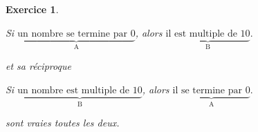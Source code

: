 \documentclass[10pt]{article}
\newtheorem{exo}{Exercice}
\begin{document}
\begin{exo}
\begin{enumerate}
\begin{center}
Si $\underbrace{\text{un nombre se termine par 0}}_{\text{A}}$, alors $\underbrace{\text{il est multiple de 10}}_{\text{B}}.$

\end{center}

et sa réciproque

\begin{center}

Si $\underbrace{\text{un nombre est multiple de 10}}_{\text{B}}$, alors $\underbrace{\text{il se termine par 0}}_{\text{A}}.$

\end{center}

sont vraies toutes les deux.

\end{enumerate}
\end{exo}
\end{document}
